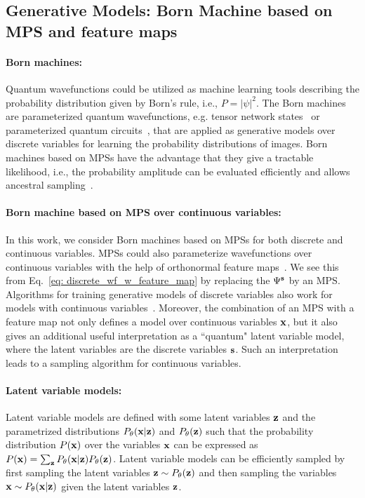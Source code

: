 \documentclass[nonatbib]{article}
\newcommand{\citep}{\cite}
\begin{document}
\subsection{Generative Models: Born Machine based on MPS and feature maps \label{sec: models}}

\paragraph{Born machines:}
Quantum wavefunctions could be utilized as machine learning tools describing the probability distribution given by Born's rule, i.e., $P=|\psi|^2$.
The Born machines~\citep{cheng2018information} are parameterized quantum wavefunctions, e.g. tensor network states~\citep{PhysRevX.8.031012,cheng2019tree} or parameterized quantum circuits~\citep{liu2018differentiable}, that are applied as generative models over discrete variables for learning  the probability distributions of images.
Born machines based on MPSs have the advantage that they give a tractable likelihood, i.e., the probability amplitude can be evaluated efficiently and allows ancestral sampling~\citep{ferris2012perfect}.



\paragraph{Born machine based on MPS over continuous variables:}
In this work, we consider Born machines based on MPSs for both discrete and continuous variables.
MPSs could also parameterize wavefunctions over continuous variables with the help of orthonormal feature maps~\citep{stoudenmire2016supervised}.
We see this from Eq.~\eqref{eq: discrete_wf_w_feature_map} by replacing the $\Psi^{\bf s}$ by an MPS.
Algorithms for training generative models of discrete variables also work for models with continuous variables~\citep{PhysRevX.8.031012}.
Moreover, the combination of an MPS with a feature map not only defines a model over continuous variables ${\bf x}$, but it also gives an additional useful interpretation as a ``quantum" latent variable model, where the latent variables are the discrete variables ${\bf s}$.
Such an interpretation leads to a sampling algorithm for continuous variables.
    
    
\paragraph{Latent variable models:}
 Latent variable models are defined with some latent variables ${\bf z}$ and the parametrized distributions $P_\theta({\bf x}| {\bf z})$ and $P_\theta( {\bf z})$ such that the probability distribution $P({\bf x})$ over the variables ${\bf x}$ can be expressed as $P({\bf x}) = \sum_{\bf z} P_\theta({\bf x}| {\bf z}) P_\theta( {\bf z})$.
Latent variable models can be efficiently sampled by first sampling the latent variables ${\bf z}\sim  P_\theta( {\bf z})$ and then sampling the variables ${\bf x} \sim P_\theta({\bf x}| {\bf z})$ given the latent variables ${\bf z}$.
 
\end{document}
